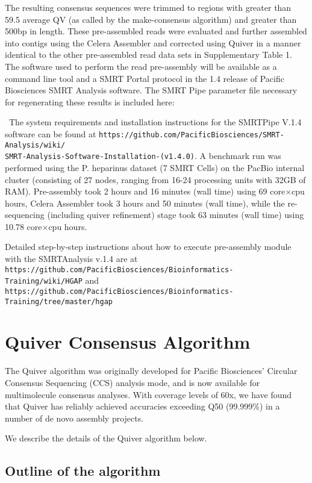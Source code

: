 \documentclass[11pt]{article}
\begin{document}
The resulting consensus sequences were trimmed to regions with greater than 59.5 average QV (as called by the make-consensus algorithm) and greater than 500bp in length. These pre-assembled reads were evaluated and further assembled into contigs using the Celera Assembler and corrected using Quiver in a manner identical to the other pre-assembled read data sets in Supplementary Table 1. The software used to perform the read pre-assembly will be available as a command line tool and a SMRT Portal protocol in the 1.4 release of Pacific Biosciences SMRT Analysis software. The SMRT Pipe parameter file necessary for regenerating these results is included here:

\
The system requirements and installation instructions for the SMRTPipe V.1.4 software can be found at
{\tt https://github.com/PacificBiosciences/SMRT-Analysis/wiki/\\
SMRT-Analysis-Software-Installation-(v1.4.0)}. A benchmark run was performed using the P. heparinus dataset (7 SMRT Cells) on the PacBio internal cluster (consisting of 27 nodes, ranging from 16-24 processing units with 32GB of RAM).  Pre-assembly took 2 hours and 16 minutes (wall time) using 69 core$\times$cpu hours, Celera Assembler took 3 hours and 50 minutes (wall time), while the re-sequencing (including quiver refinement) stage took 63 minutes (wall time) using 10.78 core$\times$cpu hours.
 
Detailed step-by-step instructions about how to execute pre-assembly module with the SMRTAnalysis v.1.4 are at \\
{\tt https://github.com/PacificBiosciences/Bioinformatics-Training/wiki/HGAP} and \\
{\tt https://github.com/PacificBiosciences/Bioinformatics-Training/tree/master/hgap}

\section{Quiver Consensus Algorithm}

The Quiver algorithm was originally developed for Pacific Biosciences' Circular Consensus Sequencing (CCS) analysis mode, and is now available for multimolecule consensus analyses.  With coverage levels of 60x, we have found that Quiver has reliably achieved accuracies exceeding Q50 (99.999\%) in a number of de novo assembly projects.

We describe the details of the Quiver algorithm below.

\subsection{Outline of the algorithm}
\end{document}
